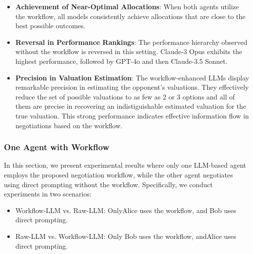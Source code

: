 \begin{minipage}[t]{1\linewidth} 
\begin{tcolorbox}[colback=gray!5,colframe=blue!40!black,title=Summary for workflow-LLM v. workflow-LLM]
\begin{itemize} 
\item \textbf{Achievement of Near-Optimal Allocations}: When both agents utilize the workflow, all models consistently achieve allocations that are close to the best possible outcomes. 
\item \textbf{Reversal in Performance Rankings}: The performance hierarchy observed without the workflow is reversed in this setting. Claude-3 Opus exhibits the highest performance, followed by GPT-4o and then Claude-3.5 Sonnet. 
\item \textbf{Precision in Valuation Estimation}: The workflow-enhanced LLMs display remarkable precision in estimating the opponent's valuations. They effectively reduce the set of possible valuations to as few as 2 or 3 options and all of them are precise in recovering an indistiguishable estimated valuation for the true valuation. This strong performance indicates effective information flow in negotiations based on the workflow.
\end{itemize} 
\end{tcolorbox} 
\end{minipage} 



\subsubsection{One Agent with Workflow}
\label{sec:oneworkflow} 

In this section, we present experimental results where only one LLM-based agent employs the proposed negotiation workflow, while the other agent negotiates using direct prompting without the workflow. Specifically, we conduct experiments in two scenarios:

\begin{itemize}
    \item Workflow-LLM vs. Raw-LLM: OnlyAlice uses the workflow, and Bob uses direct prompting.
    \item Raw-LLM vs. Workflow-LLM: Only Bob uses the workflow, andAlice uses direct prompting.
\end{itemize}



